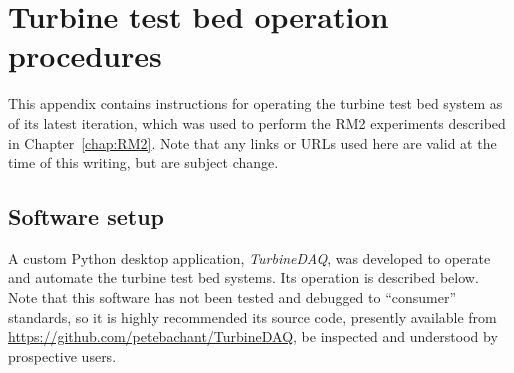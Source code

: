 \chapter{Turbine test bed operation procedures}
\doublespace

This appendix contains instructions for operating the turbine test bed system as
of its latest iteration, which was used to perform the RM2 experiments described
in Chapter~\ref{chap:RM2}. Note that any links or URLs used here are valid at
the time of this writing, but are subject change.


\section{Software setup}

A custom Python desktop application, \textit{TurbineDAQ}, was developed to
operate and automate the turbine test bed systems. Its operation is described
below. Note that this software has not been tested and debugged to ``consumer''
standards, so it is highly recommended its source code, presently available from
\url{https://github.com/petebachant/TurbineDAQ}, be inspected and understood by
prospective users.






